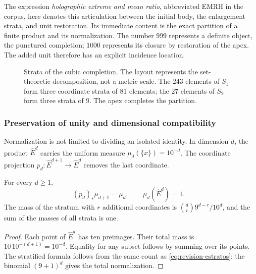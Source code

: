 The expression \emph{holographic extreme and mean ratio}, abbreviated EMRH in
the corpus, here denotes this articulation between the initial body, the
enlargement strata, and unit restoration. Its immediate content
is the exact partition of a finite product and its normalization. The number
\(999\) represents a definite object, the punctured completion;
\(1000\) represents its closure by restoration of the apex. The added
unit therefore has an explicit incidence location.

\begin{figure}[htbp]
\centering
{}
\caption{Strata of the cubic completion. The layout represents
the set-theoretic decomposition, not a metric scale. The \(243\) elements
of \(S_1\) form three coordinate strata of \(81\) elements; the \(27\)
elements of \(S_2\) form three strata of \(9\). The apex completes the partition.}
\label{fig:revision-emrh}
\end{figure}



\subsubsection{Preservation of unity and dimensional compatibility}

Normalization is not limited to dividing an isolated identity. In dimension
\(d\), the product \(\widehat E^d\) carries the uniform measure
\(\mu_d(\{x\})=10^{-d}\). The coordinate projection
\(p_d:\widehat E^{d+1}\to\widehat E^d\) removes the last coordinate.

\begin{proposition}
For every \(d\geq1\),
\[
 (p_d)_*\mu_{d+1}=\mu_d,
 \qquad \mu_d(\widehat E^d)=1.
\]
The mass of the stratum with \(r\) additional coordinates is
\(\binom dr9^{d-r}/10^d\), and the sum of the masses of all strata
is one.
\end{proposition}
\begin{proof}
Each point of \(\widehat E^d\) has ten preimages. Their total mass is
\(10\,10^{-(d+1)}=10^{-d}\). Equality for any subset
follows by summing over its points. The stratified formula follows
from the same count as \eqref{eq:revision-estratos}; the binomial
\((9+1)^d\) gives the total normalization.
\end{proof}

